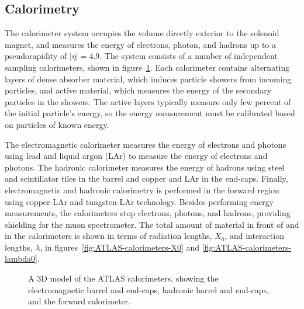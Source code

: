 \subsection{Calorimetry}\label{sec:ATLAS-calorimeters}
The calorimeter system occupies the volume directly exterior to the solenoid magnet, and measures the energy of electrons, photon, and hadrons up to a pseudorapidity of $|\eta|=4.9$. The system consists of a number of independent sampling calorimeters, shown in figure~\ref{fig:ATLAS-calorimeters}. Each calorimeter contains alternating layers of dense absorber material, which induces particle showers from incoming particles, and active material, which measures the energy of the secondary particles in the showers. The active layers typically measure only few percent of the initial particle's energy, so the energy measurement must be calibrated based on particles of known energy.

The electromagnetic calorimeter measures the energy of electrons and photons using lead and liquid argon (LAr) to measure the energy of electrons and photons. The hadronic calorimeter measures the energy of hadrons using steel and scintillator tiles in the barrel and copper and LAr in the end-caps. Finally, electromagnetic and hadronic calorimetry is performed in the forward region using copper-LAr and tungsten-LAr technology. Besides performing energy measurements, the calorimeters stop electrons, photons, and hadrons, providing shielding for the muon spectrometer. The total amount of material in front of and in the calorimeters is shown in terms of radiation lengths, $X_0$, and interaction lengths, $\lambda$, in figures~\ref{fig:ATLAS-calorimeters-X0} and \ref{fig:ATLAS-calorimeters-lambda0}.

\begin{figure}[htbp]
	\centering
	\caption{A 3D model of the ATLAS calorimeters, showing the electromagnetic barrel and end-caps, hadronic barrel and end-caps, and the forward calorimeter.}
	\label{fig:ATLAS-calorimeters}
\end{figure}

